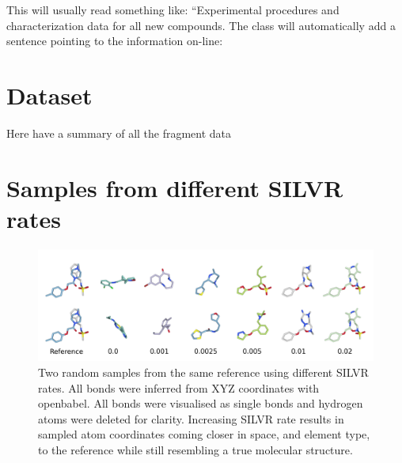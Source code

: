 \begin{suppinfo}

This will usually read something like: ``Experimental procedures and
characterization data for all new compounds. The class will
automatically add a sentence pointing to the information on-line:
\section{Dataset}
Here have a summary of all the fragment data

\section{Samples from different SILVR rates}
\begin{figure}
    \centering
    \includegraphics[width=\textwidth]{paper/Figures/FigS2/fig_2_sample_vs_rate.png}
    \caption{Two random samples from the same reference using different SILVR rates. All bonds were inferred from XYZ coordinates with openbabel. All bonds were visualised as single bonds and hydrogen atoms were deleted for clarity. Increasing SILVR rate results in sampled atom coordinates coming closer in space, and element type, to the reference while still resembling a true molecular structure.}
    \label{fig:fig_2}
\end{figure}


\end{suppinfo}